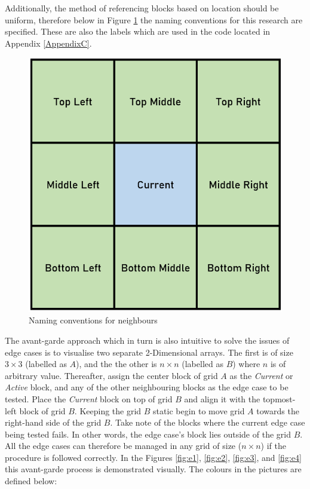 Additionally, the method of referencing blocks based on location should be uniform, therefore below in Figure \ref{fig:labs} the naming conventions for this research are specified. These are also the labels which are used in the code located in Appendix \ref{AppendixC}. 
\begin{figure}[H]
\centering
\includegraphics[scale=0.5]{Figures/Chapter3/labels}
\caption{Naming conventions for neighbours}
\label{fig:labs}
\end{figure}
The avant-garde approach which in turn is also intuitive to solve the issues of edge cases is to visualise two separate 2-Dimensional arrays. The first is of size $3 \times 3$ (labelled as $A$), and the the other is $n \times n$ (labelled as $B$) where $n$ is of arbitrary value. Thereafter, assign the center block of grid $A$ as the \textit{Current} or \textit{Active} block, and any of the other neighbouring blocks as the edge case to be tested. Place the \textit{Current} block on top of grid $B$ and align it with the topmost-left block of grid $B$. Keeping the grid $B$ static begin to move grid $A$ towards the right-hand side of the grid $B$. Take note of the blocks where the current edge case being tested fails. In other words, the edge case's block lies outside of the grid $B$. All the edge cases can therefore be managed in any grid of size ($n \times n$) if  the procedure is followed correctly. In the Figures \ref{fig:e1}, \ref{fig:e2}, \ref{fig:e3}, and \ref{fig:e4} this avant-garde process is demonstrated visually. The colours in the pictures are defined below:

